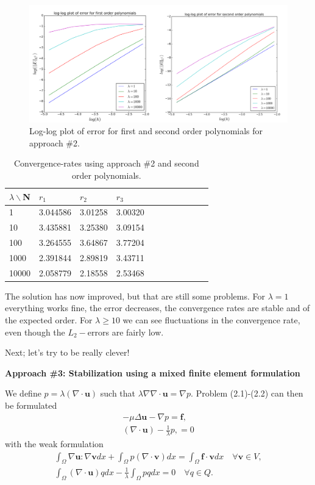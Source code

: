 \documentclass[11pt,a4paper,english]{article}
\numberwithin{equation}{section}
\begin{document}
\begin{figure}[h!] 
\begin{center}
  \includegraphics[scale=0.25]{LE1.png}
  \end{center}
  \caption{Log-log plot of error for first and second order polynomials for approach \#2.}
\end{figure}


\begin{table}[H]
\centering
\caption{Convergence-rates using approach \#2 and second order polynomials. }
\vspace{3mm}
\begin{tabular}{|l|l|l|l|l|l|l|l|l|l|l|}
\hline
$\lambda \backslash$N & $r_1$ & $r_2$ & $r_3$ \\
\hline
1 & 3.044586 & 3.01258 & 3.00320 \\
\hline
10 & 3.435881 & 3.25380 & 3.09154 \\
\hline
100 & 3.264555 & 3.64867 & 3.77204 \\
\hline
1000 & 2.391844 & 2.89819 & 3.43711 \\
\hline
10000 & 2.058779 & 2.18558 & 2.53468 \\
\hline
\end{tabular}
\end{table}

The solution has now improved, but that are still some problems. For $\lambda=1$ everything works fine, the error decreases, the convergence rates are stable and of the expected order. For $\lambda \geq 10$ we can see fluctuations in the convergence rate, even though the $L_2-$errors are fairly low. 

Next; let's try to be really clever!

\textbf{Approach \#3: Stabilization using a mixed finite element formulation}

We define $p=\lambda(\nabla \cdot \mathbf{u})$ such that $\lambda \nabla \nabla \cdot \mathbf{u} = \nabla p$. Problem (2.1)-(2.2) can then be formulated
\begin{align*}
-\mu \Delta \mathbf{u} - \nabla p = \mathbf{f}, \\ 
(\nabla \cdot \mathbf{u}) - \frac{1}{\lambda} p, = 0
\end{align*}
with the weak formulation 
\begin{align*}
\int_\Omega \nabla \mathbf{u} : \nabla \mathbf{v} dx + \int_\Omega p(\nabla \cdot \mathbf{v}) dx = \int_\Omega \mathbf{f} \cdot \mathbf{v} dx \quad \forall \mathbf{v}\in V,  \\
\int_\Omega (\nabla \cdot \mathbf{u})q dx - \frac{1}{\lambda} \int_{\Omega} pq dx = 0 \quad \forall q \in Q. 
\end{align*}
\end{document}
